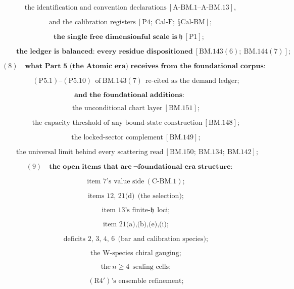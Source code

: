 \documentclass[11pt,openany]{report}
\theoremstyle{canonplain}
\theoremstyle{canondef}
\begin{document}
\[
\ \ \text{the identification and convention declarations}\ [\text{A-BM.1--A-BM.13}],
\]

\[
\ \ \text{and the calibration registers}\ [\text{P4};\ \mathrm{Cal\text{-}F};\ \text{§Cal-BM}];
\]

\[
\textbf{the single free dimensionful scale is}\ \mathfrak h\ [\mathrm{P1}];
\]

\[
\qquad \textbf{the ledger is balanced: every residue dispositioned}\ [\mathrm{BM.143}(6);\ \mathrm{BM.144}(7)];
\]

\[
(8)\quad\textbf{what Part 5 (the Atomic era) receives from the foundational corpus:}
\]

\[
\qquad (\mathrm{P5.1})\text{--}(\mathrm{P5.10})\ \ \text{of}\ \mathrm{BM.143}(7)\ \ \text{re-cited as the demand ledger};
\]

\[
\textbf{and the foundational additions:}
\]

\[
\qquad \text{the unconditional chart layer}\ [\mathrm{BM.151}];
\]

\[
\qquad \text{the capacity threshold of any bound-state construction}\ [\mathrm{BM.148}];
\]

\[
\qquad \text{the locked-sector complement}\ [\mathrm{BM.149}];
\]

\[
\qquad \text{the universal limit behind every scattering read}\ [\mathrm{BM.150};\ \mathrm{BM.134};\ \mathrm{BM.142}];
\]

\[
(9)\quad\textbf{the open items that are}\ \neg\textbf{foundational-era structure:}
\]

\[
\qquad \text{item 7's value side}\ (\mathrm{C\text{-}BM.1});
\]

\[
\qquad \text{items 12, 21(d)}\ \ \text{(the selection)};
\]

\[
\qquad \text{item 13's finite-}\mathfrak h\ \ \text{loci};
\]

\[
\qquad \text{item 21(a),(b),(e),(i)};
\]

\[
\qquad \text{deficits 2, 3, 4, 6}\ \ \text{(bar and calibration species)};
\]

\[
\qquad \text{the W-species chiral gauging};
\]

\[
\qquad \text{the}\ n\ge4\ \ \text{sealing cells};
\]

\[
\qquad (\mathrm{R4}')\text{'s ensemble refinement};
\]
\end{document}
